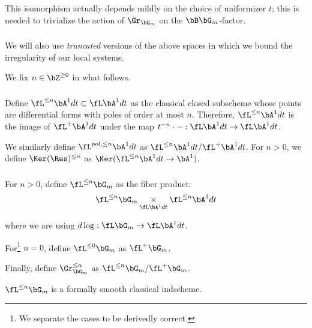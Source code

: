 \begin{rem}
\notready

This isomorphism actually depends mildly on the choice of uniformizer $t$;
this is needed to trivialize the action of
$\Gr_{\bG_m}$ on the $\bB \bG_m$-factor.

\end{rem}

\subsubsection{}

We will also use \emph{truncated} versions of the above spaces in
which we bound the irregularity of our local systems.

We fix $n \in \bZ^{\geq 0}$ in what follows.

\subsubsection{}

Define $\fL^{\leq n} \bA^1 dt \subset \fL \bA^1 dt$ as the
classical closed subscheme whose points are differential
forms with poles of order at most $n$. Therefore,
$\fL^{\leq n} \bA^1 dt$ is the image of $\fL^+ \bA^1 dt$ under the
map $t^{-n} \cdot -:\fL \bA^1 dt \to \fL \bA^1 dt$.

We similarly define $\fL^{pol,\leq n} \bA^1 dt$ as
$\fL^{\leq n} \bA^1 dt/\fL^+ \bA^1 dt$. For $n > 0$, we define
$\Ker(\Res)^{\leq n}$ as $\Ker(\fL^{\leq n} \bA^1 dt \to \bA^1)$.

\subsubsection{}\label{ss:loop-gr-trun}

For $n>0$, define $\fL^{\leq n} \bG_m$ as the fiber product:
%
\[
\fL^{\leq n} \bG_m \underset{\fL \bA^1 dt}{\times} \fL^{\leq n} \bA^1 dt
\]

 where we are using $d\log:\fL \bG_m \to \fL \bA^1 dt$.

For\footnote{We separate the cases to be derivedly correct.}
$n = 0$, define $\fL^{\leq 0} \bG_m$ as $\fL^+ \bG_m$.

Finally, define $\Gr_{\bG_m}^{\leq n}$ as $\fL^{\leq n}\bG_m/\fL^+\bG_m$.

\begin{lem}
\notready

$\fL^{\leq n} \bG_m$ is a formally smooth classical indscheme.

\end{lem}

